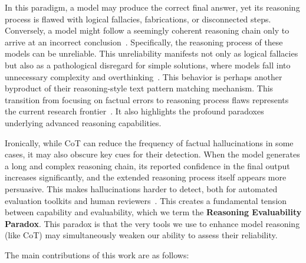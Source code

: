 In this paradigm, a model may produce the correct final answer, yet its reasoning process is flawed with logical fallacies, fabrications, or disconnected steps.
Conversely, a model might follow a seemingly coherent reasoning chain only to arrive at an incorrect conclusion~\cite{joshi2024llms,yao2025reasoning}.
Specifically, the reasoning process of these models can be unreliable.
This unreliability manifests not only as logical fallacies but also as a pathological disregard for simple solutions, where models fall into unnecessary complexity and overthinking~\cite{peng2025revisiting,fan2025missing}.
This behavior is perhaps another byproduct of their reasoning-style text pattern matching mechanism.
This transition from focusing on factual errors to reasoning process flaws represents the current research frontier~\cite{jiao2025trustworthy}.
It also highlights the profound paradoxes underlying advanced reasoning capabilities.

Ironically, while CoT can reduce the frequency of factual hallucinations in some cases, it may also obscure key cues for their detection.
When the model generates a long and complex reasoning chain, its reported confidence in the final output increases significantly, and the extended reasoning process itself appears more persuasive.
This makes hallucinations harder to detect, both for automated evaluation toolkits and human reviewers~\cite{cheng2025chain}.
This creates a fundamental tension between capability and evaluability, which we term the \textbf{Reasoning Evaluability Paradox}.
This paradox is that the very tools we use to enhance model reasoning (like CoT) may simultaneously weaken our ability to assess their reliability.

The main contributions of this work are as follows:

